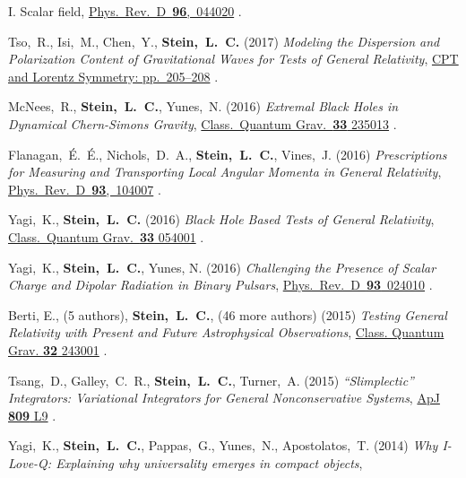 \begin{etaremune}[start=\value{pubCounter}]
{    I. Scalar field},
  \href{https://doi.org/10.1103/PhysRevD.96.044020}{Phys.~Rev.~D~{\bf 96},~044020}
  .
\item
  Tso,~R., Isi,~M., Chen,~Y., {\bf Stein,~L.~C.}
  (2017)
  {\it Modeling the Dispersion and Polarization Content of
    Gravitational Waves for Tests of General Relativity},
  \href{http://dx.doi.org/10.1142/9789813148505_0052}{CPT and Lorentz Symmetry: pp.~205--208}
  .
\item
  McNees,~R., {\bf Stein,~L.~C.}, Yunes,~N.
  (2016)
  {\it Extremal Black Holes in Dynamical Chern-Simons Gravity},
  \href{http://dx.doi.org/10.1088/0264-9381/33/23/235013}{Class.~Quantum Grav.~{\bf 33} 235013}
  .
\item
  Flanagan,~\'E.~\'E., Nichols,~D.~A., {\bf Stein,~L.~C.}, Vines,~J.
  (2016)
  {\it Prescriptions for Measuring and Transporting Local Angular
    Momenta in General Relativity},
  \href{http://dx.doi.org/10.1103/PhysRevD.93.104007}{Phys.~Rev.~D~{\bf 93},~104007}
  .
\item
  Yagi,~K., {\bf Stein,~L.~C.}
  (2016)
  {\it Black Hole Based Tests of General Relativity},
  \href{http://dx.doi.org/10.1088/0264-9381/33/5/054001}{Class.~Quantum Grav.~{\bf 33} 054001}
  .
\item
  Yagi,~K., {\bf Stein,~L.~C.}, Yunes, N.
  (2016)
  {\it Challenging the Presence of Scalar Charge and Dipolar Radiation
    in Binary Pulsars},
  \href{http://dx.doi.org/doi:10.1103/PhysRevD.93.024010}{Phys.~Rev.~D~{\bf 93}~024010}
  .
\item
  Berti, E., (5 authors), {\bf Stein,~L.~C.}, (46 more authors)
  (2015)
  {\it Testing General Relativity with Present and Future
    Astrophysical Observations},
  \href{http://dx.doi.org/10.1088/0264-9381/32/24/243001}{Class. Quantum Grav. {\bf 32} 243001}
  .
\item
  Tsang,~D., Galley,~C.~R., {\bf Stein,~L.~C.}, Turner,~A.
  (2015)
  {\it ``Slimplectic'' Integrators: Variational Integrators for General Nonconservative Systems},
  \href{http://dx.doi.org/10.1088/2041-8205/809/1/L9}{ApJ {\bf 809} L9}
  .
\item
  Yagi,~K., {\bf Stein,~L.~C.}, Pappas,~G., Yunes,~N., Apostolatos,~T.
  (2014)
  {\it Why I-Love-Q: Explaining why universality emerges in compact objects},

\end{etaremune}
